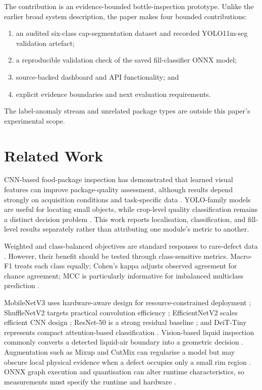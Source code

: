 \documentclass[conference]{../IEEE_paper/IEEEtran}
\begin{document}
The contribution is an evidence-bounded bottle-inspection prototype. Unlike the earlier broad system description, the paper makes four bounded contributions:
\begin{enumerate}
\item an audited six-class cap-segmentation dataset and recorded YOLO11m-seg validation artefact;
\item a reproducible validation check of the saved fill-classifier ONNX model;
\item source-backed dashboard and API functionality; and
\item explicit evidence boundaries and next evaluation requirements.
\end{enumerate}
The label-anomaly stream and unrelated package types are outside this paper's experimental scope.

\section{Related Work}
CNN-based food-package inspection has demonstrated that learned visual features can improve package-quality assessment, although results depend strongly on acquisition conditions and task-specific data \cite{banus2021,liakos2025}. YOLO-family models are useful for locating small objects, while crop-level quality classification remains a distinct decision problem \cite{redmon2018,wang2022}. This work reports localisation, classification, and fill-level results separately rather than attributing one module's metric to another.

Weighted and class-balanced objectives are standard responses to rare-defect data \cite{buda2018,cui2019,lin2017}. However, their benefit should be tested through class-sensitive metrics. Macro-F1 treats each class equally; Cohen's kappa adjusts observed agreement for chance agreement; MCC is particularly informative for imbalanced multiclass prediction \cite{cohen1960,chicco2020}.

MobileNetV3 uses hardware-aware design for resource-constrained deployment \cite{howard2019}; ShuffleNetV2 targets practical convolution efficiency \cite{ma2018}; EfficientNetV2 scales efficient CNN design \cite{tan2021}; ResNet-50 is a strong residual baseline \cite{he2016}; and DeiT-Tiny represents compact attention-based classification \cite{touvron2021}. Vision-based liquid inspection commonly converts a detected liquid-air boundary into a geometric decision \cite{chatchapol2024,farhangi2024}. Augmentation such as Mixup and CutMix can regularise a model but may obscure local physical evidence when a defect occupies only a small rim region \cite{zhang2018,yun2019}. ONNX graph execution and quantisation can alter runtime characteristics, so measurements must specify the runtime and hardware \cite{onnx2019,onnxruntime2026,jacob2018}.
\end{document}
